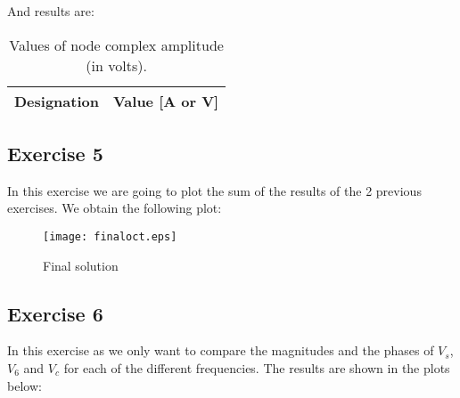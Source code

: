 And results are:

\begin{table}[H]
  \centering
  \begin{tabular}{|c|c|}
    \hline
        {\bf Designation} & {\bf Value [A or V]} \\ \hline
        
  \end{tabular}
  \caption{Values of node complex amplitude (in volts).}
  \label{tab:Exercise2Theoretical}
\end{table}

\subsection{Exercise 5}
In this exercise we are going to plot the sum of the results of the 2 previous exercises. We obtain the following plot:
\begin{figure}[h] \centering
\texttt{[image: finaloct.eps]}
\caption{Final solution}
\label{fig:finaloct}
\end{figure}

\subsection{Exercise 6}
In this exercise as we only want to compare the magnitudes and the phases of $V_s$,$V_6$ and $V_c$ for each of the different frequencies. The results are shown in the plots below:

